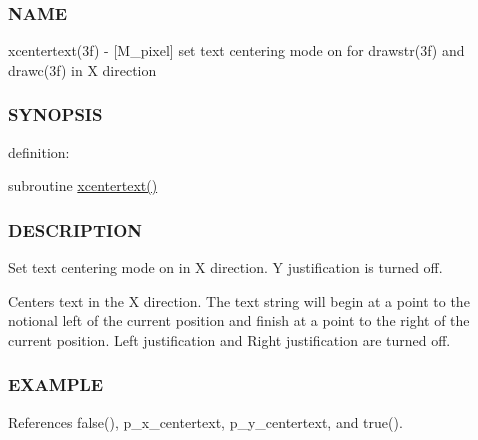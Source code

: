 \subsubsection*{N\+A\+ME}

xcentertext(3f) -\/ \mbox{[}M\+\_\+pixel\mbox{]} set text centering mode on for drawstr(3f) and drawc(3f) in X direction 

\subsubsection*{S\+Y\+N\+O\+P\+S\+IS}

definition\+:

subroutine \hyperlink{namespacem__pixel_a1e0c43d36b35eafea921f91c31d8a478}{xcentertext()}

\subsubsection*{D\+E\+S\+C\+R\+I\+P\+T\+I\+ON}

Set text centering mode on in X direction. Y justification is turned off.

Centers text in the X direction. The text string will begin at a point to the notional left of the current position and finish at a point to the right of the current position. Left justification and Right justification are turned off.

\subsubsection*{E\+X\+A\+M\+P\+LE}

References false(), p\+\_\+x\+\_\+centertext, p\+\_\+y\+\_\+centertext, and true().

